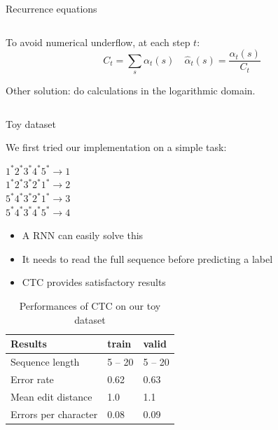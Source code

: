 \documentclass[final]{beamer}
\newlength{\onecolwid}
\newlength{\twocolwid}
\begin{document}
\begin{frame}[t]
\begin{columns}[t]
\begin{column}{\twocolwid}
\begin{block}{Recurrence equations}
\begin{columns}[t,totalwidth=\twocolwid]
\begin{column}{\onecolwid}
To avoid numerical underflow, at each step $t$:
\[
C_t = \sum_s \alpha_t(s)
\hspace{1em}
\hat{\alpha}_t(s) = \frac{\alpha_t(s)}{C_t}
\]

Other solution: do calculations in the logarithmic domain. 


\end{column} %

\end{columns} %


\end{block}

\begin{columns}[t,totalwidth=\twocolwid] %
\begin{column}{\onecolwid} %

\begin{block}{Toy dataset}

We first tried our implementation on a simple task:

{\centering
$1^*2^*3^*4^*5^* \to 1$  \\
$1^*2^*3^*2^*1^* \to 2$  \\
$5^*4^*3^*2^*1^* \to 3$  \\
$5^*4^*3^*4^*5^* \to 4$  \\
}

\begin{itemize}
\item A RNN can easily solve this
\item It needs to read the full sequence before predicting a label
\item CTC provides satisfactory results
\end{itemize}

\begin{table}
\vspace{2ex}
\begin{tabular}{l l l}
\toprule
\textbf{Results} & \textbf{train} & \textbf{valid}\\ 
\midrule
Sequence length & 5 -- 20 & 5 -- 20 \\
Error rate & 0.62 & 0.63 \\
Mean edit distance & 1.0 & 1.1 \\ 
Errors per character & 0.08 & 0.09 \\
\bottomrule
\end{tabular}
\caption{Performances of CTC on our toy dataset}
\end{table}


\end{block}
\end{column}
\end{columns}
\end{column}
\end{columns}
\end{frame}
\end{document}
